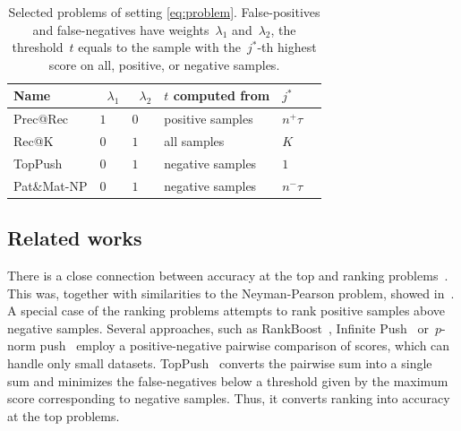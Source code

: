 \begin{table}[!ht]
  \centering
  \begin{tabular}{@{}llllll@{}}
    \toprule
    Name &~$\lambda_1$ &~$\lambda_2$ & $t$ computed from & $j^*$ \\
    \midrule
    Prec@Rec    & $1$ & $0$ & positive samples & $n^+\tau$ \\
    Rec@K       & $0$ & $1$ & all samples      & $K$ \\
    TopPush     & $0$ & $1$ & negative samples & $1$ \\
    Pat\&Mat-NP & $0$ & $1$ & negative samples & $n^-\tau$ \\
    \bottomrule
  \end{tabular}
  \caption{Selected problems of setting \eqref{eq:problem}. False-positives and false-negatives have weights~$\lambda_1$ and~$\lambda_2$, the threshold~$t$ equals to the sample with the~$j^*$-th highest score on all, positive, or negative samples.}
  \label{table:summary}
\end{table}

\subsection{Related works}

There is a close connection between accuracy at the top and ranking problems~\cite{batmaz2019review,werner2019review}. This was, together with similarities to the Neyman-Pearson problem, showed in~\cite{adam2019patmat}. A special case of the ranking problems attempts to rank positive samples above negative samples. Several approaches, such as RankBoost~\cite{freund2003efficient}, Infinite Push~\cite{agarwal2011infinite} or~$p$-norm push~\cite{rudin2009pnorm} employ a positive-negative pairwise comparison of scores, which can handle only small datasets. TopPush~\cite{li2014top} converts the pairwise sum into a single sum and minimizes the false-negatives below a threshold given by the maximum score corresponding to negative samples. Thus, it converts ranking into accuracy at the top problems.

